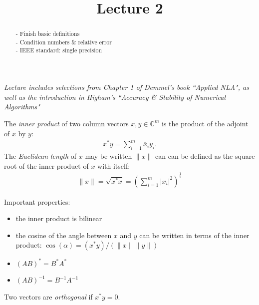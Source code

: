 \documentclass{ximera}
\begin{document}
    \title{Lecture 2}
    
    \begin{abstract} 
    - Finish basic definitions \\
    - Condition numbers \& relative error \\
    - IEEE standard: single precision
    \end{abstract}
    \maketitle

\textit{Lecture includes selections from Chapter 1 of Demmel's book ``Applied NLA", as well as the introduction in Higham's ``Accuracy \& Stability of Numerical Algorithms"}


\begin{definition}
    The \textit{inner product} of two column vectors $x,y \in \mathbb{C}^m$ is the product of the adjoint of $x$ by $y$:
    \begin{align}
        x^*y = \sum\limits_{i=1}^m \overline{x}_iy_i.
    \end{align}
    The \textit{Euclidean length} of $x$ may be written $\|x\|$ can can be defined as the square root of the inner product of $x$ with itself:
    \begin{align}
        \|x\| = \sqrt{x^*x} = \left(\sum\limits_{i=1}^m |x_i|^2\right)^{\frac12}
    \end{align}
 \end{definition}

Important properties:
\begin{itemize}
    \item the inner product is bilinear
    \item the cosine of the angle between $x$ and $y$ can be written in terms of the inner product: $\cos(\alpha) = (x^*y)/(\|x\|\|y\|)$
    \item $(AB)^* = B^*A^*$
    \item $(AB)^{-1} = B^{-1}A^{-1}$
\end{itemize}
\begin{definition}
    Two vectors are \textit{orthogonal} if $x^*y = 0$.
\end{definition}
\end{document}
